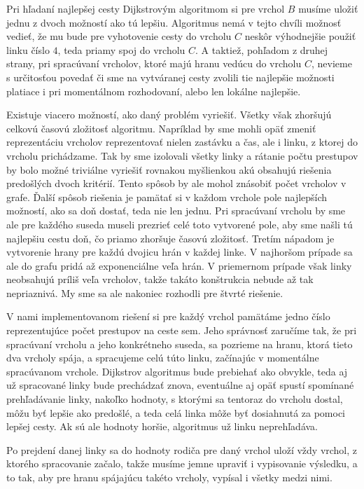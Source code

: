 Pri hľadaní najlepšej cesty Dijkstrovým algoritmom si pre vrchol $B$ musíme uložiť jednu z dvoch možností ako tú lepšiu. Algoritmus nemá v tejto chvíli možnosť vedieť, že mu bude pre vyhotovenie cesty do vrcholu $C$ neskôr výhodnejšie použiť linku číslo $4$, teda priamy spoj do vrcholu $C$. A taktiež, pohľadom z druhej strany, pri spracúvaní vrcholov, ktoré majú hranu vedúcu do vrcholu $C$, nevieme s určitosťou povedať či sme na vytváranej cesty zvolili tie najlepšie možnosti platiace i pri momentálnom rozhodovaní, alebo len lokálne najlepšie.\newline

Existuje viacero možností, ako daný problém vyriešiť. Všetky však zhoršujú celkovú časovú zložitosť algoritmu. Napríklad by sme mohli opäť zmeniť reprezentáciu vrcholov \textendash  reprezentovať nielen zastávku a čas, ale i linku, z ktorej do vrcholu prichádzame. Tak by sme izolovali všetky linky a rátanie počtu prestupov by bolo možné triviálne vyriešiť rovnakou myšlienkou akú obsahujú riešenia predošlých dvoch kritérií. Tento spôsob by ale mohol znásobiť počet vrcholov v grafe. Ďalší spôsob riešenia je pamätať si v každom vrchole pole najlepších možností, ako sa doň dostať, teda nie len jednu. Pri spracúvaní vrcholu by sme ale pre každého suseda museli prezrieť celé toto vytvorené pole, aby sme našli tú najlepšiu cestu doň, čo priamo zhoršuje časovú zložitosť. Tretím nápadom je vytvorenie hrany pre každú dvojicu hrán v každej linke. V najhoršom prípade sa ale do grafu pridá až exponenciálne veľa hrán. V priemernom prípade však linky neobsahujú príliš veľa vrcholov, takže takáto konštrukcia nebude až tak nepriaznivá. My sme sa ale nakoniec rozhodli pre štvrté riešenie.\newline

V nami implementovanom riešení si pre každý vrchol pamätáme jedno číslo reprezentujúce počet prestupov na ceste sem. Jeho správnosť zaručíme tak, že pri spracúvaní vrcholu a jeho konkrétneho suseda, sa pozrieme na hranu, ktorá tieto dva vrcholy spája, a spracujeme celú túto linku, začínajúc v momentálne spracúvanom vrchole. Dijkstrov algoritmus bude prebiehať ako obvykle, teda aj už spracované linky bude prechádzať znova, eventuálne aj opäť spustí spomínané prehľadávanie linky, nakoľko hodnoty, s ktorými sa tentoraz do vrcholu dostal, môžu byť lepšie ako predošlé, a teda celá linka môže byť dosiahnutá za pomoci lepšej cesty. Ak sú ale hodnoty horšie, algoritmus už linku neprehľadáva.\newline

Po prejdení danej linky sa do hodnoty rodiča pre daný vrchol uloží vždy vrchol, z ktorého spracovanie začalo, takže musíme jemne upraviť i vypisovanie výsledku, a to tak, aby pre hranu spájajúcu takéto vrcholy, vypísal i všetky medzi nimi.\newline 

